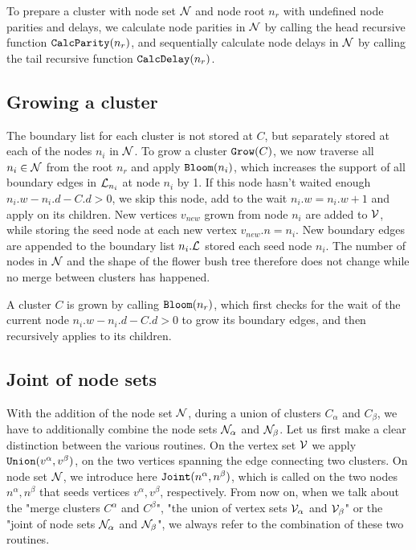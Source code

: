 \begin{theorem}
  To prepare a cluster with node set $\mathcal{N}$ and node root $n_r$ with undefined node parities and delays, we calculate node parities in $\mathcal{N}$ by calling the head recursive function $\texttt{CalcParity}(n_r)$, and sequentially calculate node delays in $\mathcal{N}$ by calling the tail recursive function $\texttt{CalcDelay}(n_r)$.
\end{theorem}


\subsection{Growing a cluster}\label{sec:growingcluster}

The boundary list for each cluster is not stored at $C$, but separately stored at each of the nodes $n_i$ in $\mathcal{N}$. To grow a cluster $\texttt{Grow}(C)$, we now traverse all $n_i \in \mathcal{N}$ from the root $n_r$ and apply $\texttt{Bloom}(n_i)$, which increases the support of all boundary edges in $\mathcal{L}_{n_i}$ at node $n_i$ by 1. If this node hasn't waited enough $n_i.w - n_i.d - C.d > 0$, we skip this node, add to the wait $n_i.w = n_i.w +1$ and apply  on its children. New vertices $v_{new}$ grown from node $n_i$ are added to $\mathcal{V}$, while storing the seed node at each new vertex $v_{new}.n = n_i$. New boundary edges are appended to the boundary list $n_i.\mathcal{L}$ stored each seed node $n_i$. The number of nodes in $\mathcal{N}$ and the shape of the flower bush tree therefore does not change while no merge between clusters has happened.

\begin{theorem}\label{the:grownode}
  A cluster $C$ is grown by calling $\texttt{Bloom}(n_r)$, which first checks for the wait of the current node $n_i.w - n_i.d - C.d> 0$ to grow its boundary edges, and then recursively applies  to its children.
\end{theorem}

\subsection{Joint of node sets}\label{sec:jointnodesets}
With the addition of the node set $\mathcal{N}$, during a union of clusters $C_\alpha$ and $C_\beta$, we have to additionally combine the node sets $\mathcal{N}_{\alpha}$ and $\mathcal{N}_\beta$. Let us first make a clear distinction between the various routines. On the vertex set $\mathcal{V}$ we apply $\texttt{Union}(v^\alpha, v^\beta)$, on the two vertices spanning the edge connecting two clusters. On node set $\mathcal{N}$, we introduce here $\texttt{Joint}(n^\alpha, n^\beta)$, which is called on the two nodes $n^\alpha, n^\beta$ that seeds vertices $v^\alpha, v^\beta$, respectively. From now on, when we talk about the "merge clusters $C^\alpha$ and $C^\beta$", "the union of vertex sets $\mathcal{V}_\alpha$ and $\mathcal{V}_\beta$" or the "joint of node sets $\mathcal{N}_{\alpha}$ and $\mathcal{N}_\beta$", we always refer to the combination of these two routines.

